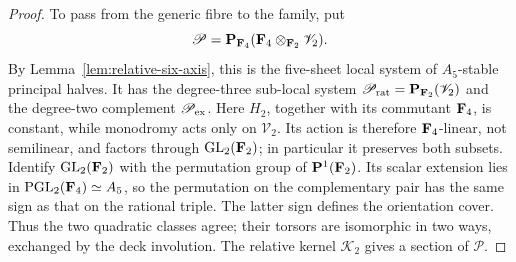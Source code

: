 \begin{proof}
To pass from the generic fibre to the family, put
\[
 \mathscr P=\mathbf P_{\mathbf F_4}(\mathbf F_4\otimes_{\mathbf F_2}\mathscr V_2).
\]
By Lemma~\ref{lem:relative-six-axis}, this is the five-sheet local system of
\(A_5\)-stable principal halves.  It has the degree-three sub-local system
\(\mathscr P_{\rm rat}=\mathbf P_{\mathbf F_2}(\mathscr V_2)\) and the degree-two
complement \(\mathscr P_{\rm ex}\).  Here \(H_2\), together with its
commutant \(\mathbf F_4\), is constant, while monodromy acts only on
\(\mathscr V_2\).  Its action is therefore \(\mathbf F_4\)-linear, not semilinear,
and factors through \(\operatorname{GL}_2(\mathbf F_2)\); in particular it
preserves both subsets.  Identify \(\operatorname{GL}_2(\mathbf F_2)\) with the
permutation group of \(\mathbf P^1(\mathbf F_2)\).  Its scalar extension lies in
\(\operatorname{PGL}_2(\mathbf F_4)\simeq A_5\), so the permutation on the
complementary pair has the same sign as that on the rational triple.  The
latter sign defines the orientation cover.  Thus the two quadratic classes
agree; their torsors are isomorphic in two ways, exchanged by the deck
involution.  The relative kernel \(\mathscr K_2\) gives a section of
\(\mathscr P\).


\end{proof}
